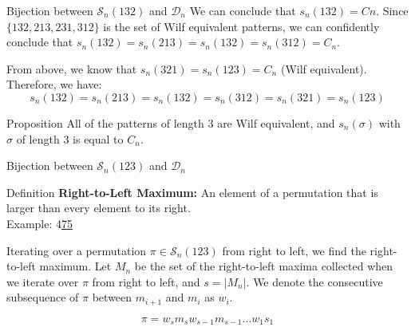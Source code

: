\documentclass{beamer}  %
\begin{document}
\begin{frame}{Bijection between $\mathcal{S}_n(132)$ and $\mathcal{D}_n$}
    We can conclude that $s_n(132) = Cn$. Since $\{132,213,231,312\}$ is the set of Wilf equivalent patterns, we can confidently conclude that $s_n(132) = s_n(213) = s_n(132) = s_n(312)=C_n$.

    From above, we know that $s_n(321)=s_n(123)=C_n$ (Wilf equivalent). Therefore, we have:
    $$s_n(132) = s_n(213) = s_n(132) = s_n(312)=s_n(321)=s_n(123)$$

    \begin{block}{Proposition}
    All of the patterns of length $3$ are Wilf equivalent, and $s_n(\sigma)$ with $\sigma$ of length $3$ is equal to $C_n$.
    \end{block}
\end{frame}
\begin{frame}{Bijection between $\mathcal{S}_n(123)$ and $\mathcal{D}_n$}
    \begin{block}{Definition}
    \textbf{Right-to-Left Maximum:} An element of a permutation that is larger than every element to its right.
    \\
    Example: 4\;\underline7\;\underline5
    \end{block}
    
    Iterating over a permutation $\pi \in \mathcal{S}_n(123)$ from right to left, we find the right-to-left maximum. Let $M_{n}$ be the set of the right-to-left maxima collected when we iterate over $\pi$ from right to left, and $s = |M_n|$. We denote the consecutive subsequence of $\pi$ between $m_{i+1}$ and $m_i$ as $w_i$.
    
    $$\pi = w_sm_sw_{s-1}m_{s-1}\ldots w_1s_1$$

    \end{frame}
\end{document}
